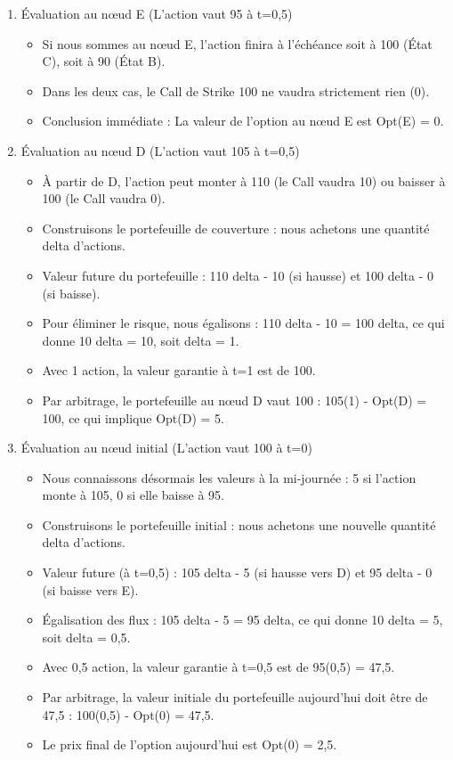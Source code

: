 \begin{enumerate}[label=Étape \arabic* :, leftmargin=*]
    
    \item Évaluation au nœud E (L'action vaut 95 à t=0,5)
    \begin{itemize}[label=$\cdot$]
        \item Si nous sommes au nœud E, l'action finira à l'échéance soit à 100 (État C), soit à 90 (État B). 
        \item Dans les deux cas, le Call de Strike 100 ne vaudra strictement rien (0).
        \item Conclusion immédiate : La valeur de l'option au nœud E est Opt(E) = 0.
    \end{itemize}
    
    \vspace{0.2cm}
    \item Évaluation au nœud D (L'action vaut 105 à t=0,5)
    \begin{itemize}[label=$\cdot$]
        \item À partir de D, l'action peut monter à 110 (le Call vaudra 10) ou baisser à 100 (le Call vaudra 0).
        \item Construisons le portefeuille de couverture : nous achetons une quantité delta d'actions.
        \item Valeur future du portefeuille : 110 delta - 10 (si hausse) et 100 delta - 0 (si baisse).
        \item Pour éliminer le risque, nous égalisons : 110 delta - 10 = 100 delta, ce qui donne 10 delta = 10, soit delta = 1.
        \item Avec 1 action, la valeur garantie à t=1 est de 100.
        \item Par arbitrage, le portefeuille au nœud D vaut 100 : 105(1) - Opt(D) = 100, ce qui implique Opt(D) = 5.
    \end{itemize}

    \vspace{0.2cm}
    \item Évaluation au nœud initial (L'action vaut 100 à t=0)
    \begin{itemize}[label=$\cdot$]
        \item Nous connaissons désormais les valeurs à la mi-journée : 5 si l'action monte à 105, 0 si elle baisse à 95.
        \item Construisons le portefeuille initial : nous achetons une nouvelle quantité delta d'actions.
        \item Valeur future (à t=0,5) : 105 delta - 5 (si hausse vers D) et 95 delta - 0 (si baisse vers E).
        \item Égalisation des flux : 105 delta - 5 = 95 delta, ce qui donne 10 delta = 5, soit delta = 0,5.
        \item Avec 0,5 action, la valeur garantie à t=0,5 est de 95(0,5) = 47,5.
        \item Par arbitrage, la valeur initiale du portefeuille aujourd'hui doit être de 47,5 : 100(0,5) - Opt(0) = 47,5.
        \item Le prix final de l'option aujourd'hui est Opt(0) = 2,5.
    \end{itemize}


\end{enumerate}
